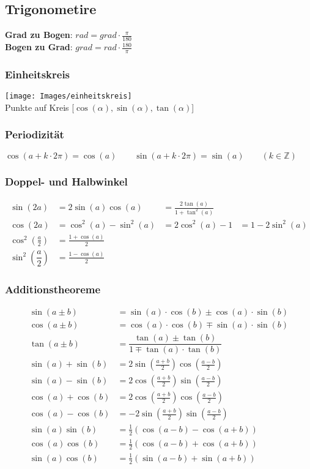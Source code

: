 \subsection{Trigonometire}
\noindent\textbf{Grad zu Bogen}: $ rad = grad \cdot \frac{\pi}{180} $~\\
\noindent\textbf{Bogen zu Grad}: $ grad = rad \cdot \frac{180}{\pi}$
\subsubsection{Einheitskreis}
\begin{center}
	\texttt{[image: Images/einheitskreis]}\\
	Punkte auf Kreis [$\cos(\alpha), \sin(\alpha), \tan(\alpha)$]
\end{center}

\subsubsection{Periodizität}
$\cos(a+k\cdot2\pi)=\cos(a) \qquad \sin(a+k\cdot2\pi)=\sin(a) \qquad
(k \in \mathbb{Z})$

\subsubsection{Doppel- und Halbwinkel}	
\begin{align*}
	\sin(2a) &=2\sin(a)\cos(a) &= \frac{2\tan(a)}{1 +\tan^2(a)}\\
	\cos(2a) &=\cos^2(a)-\sin^2(a) &= 2\cos^2(a)-1 &= 1-2\sin^2(a)\\
	\cos^2 \left(\frac{a}{2}\right) &=\frac{1+\cos(a)}{2} \\
	\sin^2 \left(\dfrac{a}{2}\right)&=\frac{1-\cos(a)}{2}
\end{align*}


\subsubsection{Additionstheoreme}
\begin{align*}
	\sin(a \pm b)&=\sin(a) \cdot \cos(b) \pm \cos(a) \cdot \sin(b)\\
	\cos(a \pm b)&=\cos(a) \cdot \cos(b) \mp \sin(a) \cdot \sin(b)\\	
	\tan(a \pm b)&=\dfrac{\tan(a) \pm \tan(b)}{1 \mp \tan(a) \cdot \tan(b)}\\
	\sin(a)+\sin(b) &= 2\sin\left(\frac{a + b}{2}\right)\cos\left(\frac{a - b}{2}\right)\\
	\sin(a)-\sin(b) &= 2\cos\left(\frac{a + b}{2}\right)\sin\left(\frac{a - b}{2}\right)\\
	\cos(a)+\cos(b) &= 2\cos\left(\frac{a + b}{2}\right)\cos\left(\frac{a - b}{2}\right)\\
	\cos(a)-\cos(b) &= -2\sin\left(\frac{a + b}{2}\right)\sin\left(\frac{a - b}{2}\right)\\
	\sin(a)\sin(b)&=\frac{1}{2}(\cos(a-b)-\cos(a+b))\\
	\cos(a)\cos(b)&=\frac{1}{2}(\cos(a-b)+\cos(a+b))\\
	\sin(a)\cos(b)&=\frac{1}{2}(\sin(a-b)+\sin(a+b))\\
\end{align*}

